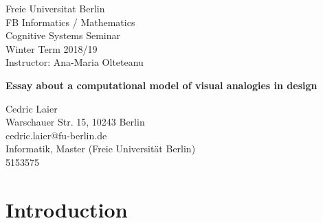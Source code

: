 \documentclass[12pt]{article}
\begin{document}
\noindent
Freie Universitat Berlin\\
FB Informatics / Mathematics\\
Cognitive Systems Seminar\\
Winter Term 2018/19\\
Instructor: Ana-Maria Olteteanu
\vspace{5cm}
\begin{center}
{\LARGE \textbf{Essay about a computational model of visual analogies in design}}
\end{center}
\vspace{8cm}

\noindent
Cedric Laier \\
Warschauer Str. 15, 10243 Berlin \\
cedric.laier@fu-berlin.de\\
Informatik, Master (Freie Universität Berlin) \\
5153575 \\
\clearpage


\section{Introduction}
\end{document}
